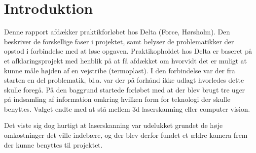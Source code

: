 \section{Introduktion}

Denne rapport afdækker praktikforløbet hos Delta (Force, Hørsholm). Den beskriver de forskellige faser i projektet, samt belyser de problematikker der opstod i forbindelse med at løse opgaven.
Praktikopholdet hos Delta er baseret på et afklaringsprojekt med henblik på at få afdækket om hvorvidt det er muligt at kunne måle højden af en vejstribe (termoplast). I den forbindelse var der fra starten en del problematik, bl.a. var der på forhånd ikke udlagt hvorledes dette skulle foregå. På den baggrund startede forløbet med at der blev brugt tre uger på indsamling af information omkring hvilken form for teknologi der skulle benyttes. Valget endte med at stå mellem 3d laserskanning eller computer vision.

Det viste sig dog hurtigt at laserskanning var udelukket grundet de høje omkostninger det ville indebære, og der blev derfor fundet et ældre kamera frem der kunne benyttes til projektet.
